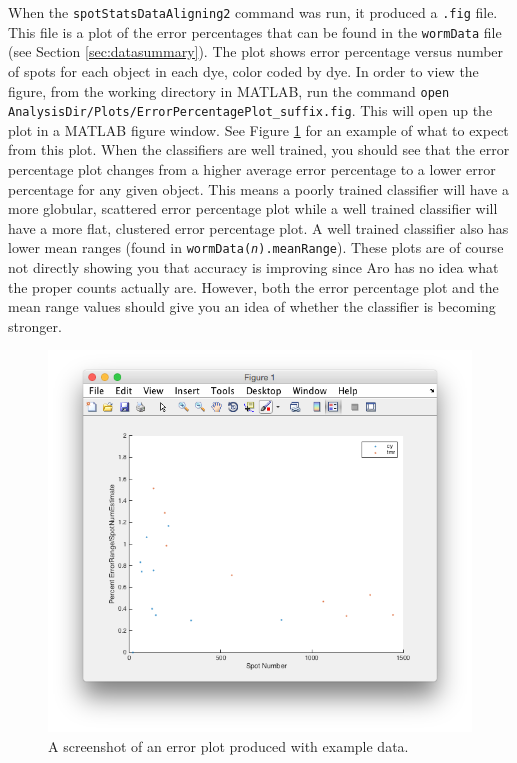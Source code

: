 \documentclass[titlepage,11pt]{article}
\begin{document}
When the \texttt{spotStatsDataAligning2} command was run, it produced a \texttt{.fig} file. This file is a plot of the error percentages that can be found in the \texttt{wormData} file (see Section \ref{sec:datasummary}). The plot shows error percentage versus number of spots for each object in each dye, color coded by dye. In order to view the figure, from the working directory in MATLAB, run the command \texttt{open AnalysisDir/Plots/ErrorPercentagePlot\_suffix.fig}. This will open up the plot in a MATLAB figure window. See Figure \ref{fig:errorPercentagePlot} for an example of what to expect from this plot. When the classifiers are well trained, you should see that the error percentage plot changes from a higher average error percentage to a lower error percentage for any given object. This means a poorly trained classifier will have a more globular, scattered error percentage plot while a well trained classifier will have a more flat, clustered error percentage plot. A well trained classifier also has lower mean ranges (found in \texttt{wormData(\textit{n}).meanRange}). These plots are of course not directly showing you that accuracy is improving since Aro has no idea what the proper counts actually are. However, both the error percentage plot and the mean range values should give you an idea of whether the classifier is becoming stronger.

\begin{figure}[H]
\centering
\includegraphics[scale=0.40]{errorPercentagePlot.png}
\caption{A screenshot of an error plot produced with example data.}
\label{fig:errorPercentagePlot}
\end{figure}
\end{document}
